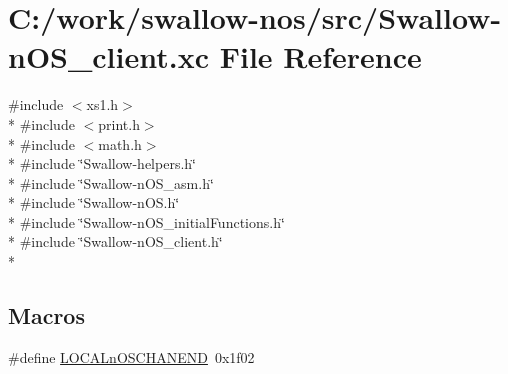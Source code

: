 \hypertarget{_swallow-n_o_s__client_8xc}{}\section{C\+:/work/swallow-\/nos/src/\+Swallow-\/n\+O\+S\+\_\+client.xc File Reference}
\label{_swallow-n_o_s__client_8xc}
{\ttfamily \#include $<$xs1.\+h$>$}\\*
{\ttfamily \#include $<$print.\+h$>$}\\*
{\ttfamily \#include $<$math.\+h$>$}\\*
{\ttfamily \#include \char`\"{}Swallow-\/helpers.\+h\char`\"{}}\\*
{\ttfamily \#include \char`\"{}Swallow-\/n\+O\+S\+\_\+asm.\+h\char`\"{}}\\*
{\ttfamily \#include \char`\"{}Swallow-\/n\+O\+S.\+h\char`\"{}}\\*
{\ttfamily \#include \char`\"{}Swallow-\/n\+O\+S\+\_\+initial\+Functions.\+h\char`\"{}}\\*
{\ttfamily \#include \char`\"{}Swallow-\/n\+O\+S\+\_\+client.\+h\char`\"{}}\\*
\subsection*{Macros}
\begin{DoxyCompactItemize}
\item 
\#define \hyperlink{_swallow-n_o_s__client_8xc_a63f27a839bf3aba3712909a1c72a4778}{L\+O\+C\+A\+Ln\+O\+S\+C\+H\+A\+N\+E\+N\+D}~0x1f02
\end{DoxyCompactItemize}
